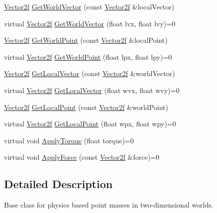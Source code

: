 \begin{DoxyCompactItemize}
\hyperlink{classastu_1_1Vector2}{Vector2f} \hyperlink{classastu_1_1suite2d_1_1CBody_a1ea8700e76d0c4f46aeb0c60bc0ea2c0}{Get\+World\+Vector} (const \hyperlink{classastu_1_1Vector2}{Vector2f} \&local\+Vector)
\item 
virtual \hyperlink{classastu_1_1Vector2}{Vector2f} \hyperlink{classastu_1_1suite2d_1_1CBody_a50fb6c9131bd42e20def02619526fdff}{Get\+World\+Vector} (float lvx, float lvy)=0
\item 
\hyperlink{classastu_1_1Vector2}{Vector2f} \hyperlink{classastu_1_1suite2d_1_1CBody_a05b6ac1a2b425cf4dad2924204707029}{Get\+World\+Point} (const \hyperlink{classastu_1_1Vector2}{Vector2f} \&local\+Point)
\item 
virtual \hyperlink{classastu_1_1Vector2}{Vector2f} \hyperlink{classastu_1_1suite2d_1_1CBody_a65c7a152ab2666e355bad3116c8f910b}{Get\+World\+Point} (float lpx, float lpy)=0
\item 
\hyperlink{classastu_1_1Vector2}{Vector2f} \hyperlink{classastu_1_1suite2d_1_1CBody_a0a03263c71e5d82a26b7e20f5cf99d5d}{Get\+Local\+Vector} (const \hyperlink{classastu_1_1Vector2}{Vector2f} \&world\+Vector)
\item 
virtual \hyperlink{classastu_1_1Vector2}{Vector2f} \hyperlink{classastu_1_1suite2d_1_1CBody_a9c1d354449c29648dc07640c7853c37d}{Get\+Local\+Vector} (float wvx, float wvy)=0
\item 
\hyperlink{classastu_1_1Vector2}{Vector2f} \hyperlink{classastu_1_1suite2d_1_1CBody_a76733d539daf6c60c595586bc72db5b7}{Get\+Local\+Point} (const \hyperlink{classastu_1_1Vector2}{Vector2f} \&world\+Point)
\item 
virtual \hyperlink{classastu_1_1Vector2}{Vector2f} \hyperlink{classastu_1_1suite2d_1_1CBody_ab8945dc57ee548799613860ebac8b87c}{Get\+Local\+Point} (float wpx, float wpy)=0
\item 
virtual void \hyperlink{classastu_1_1suite2d_1_1CBody_a12f4b86353c5ed3adabbd900f2c43dba}{Apply\+Torque} (float torque)=0
\item 
virtual void \hyperlink{classastu_1_1suite2d_1_1CBody_a093468615f7e9de0b55e7af7aca2cf5e}{Apply\+Force} (const \hyperlink{classastu_1_1Vector2}{Vector2f} \&force)=0
\end{DoxyCompactItemize}


\subsection{Detailed Description}
Base class for physics based point masses in two-\/dimensional worlds. 


